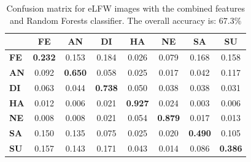\begin{table}[H]
	\fontsize{12}{12}
	\centering
	
	\caption{Confusion matrix for eLFW images with the combined features and Random Forests classifier. The overall accuracy is: $67.3\%$}
	\label{Table:eLFW&Random}
	\begin{tabular}{@{}|l|c|c|c|c|c|c|c|@{}}
		\hline
		& \textbf{FE}     & \textbf{AN}    & \textbf{DI}    & \textbf{HA} & \textbf{NE} & \textbf{SA}    & \textbf{SU}            \\ \hline 
		\textbf{FE} & \textbf{0.232} & 0.153          & 0.184          & 0.026           & 0.079           & 0.168          & 0.158           \\ \hline 
		\textbf{AN} & 0.092          & \textbf{0.650} & 0.058          & 0.025           & 0.017           & 0.042          & 0.117           \\ \hline 
		\textbf{DI} & 0.063          & 0.044          & \textbf{0.738} & 0.050           & 0.038           & 0.038          & 0.031           \\ \hline 
		\textbf{HA} & 0.012          & 0.006          & 0.021          & \textbf{0.927}  & 0.024           & 0.003          & 0.006           \\ \hline 
		\textbf{NE} & 0.008          & 0.008           & 0.021          & 0.054           & \textbf{0.879}  & 0.017           & 0.013          \\ \hline 
		\textbf{SA} & 0.150          & 0.135          & 0.075          & 0.025           & 0.020           & \textbf{0.490}  & 0.105               \\ \hline 
		\textbf{SU} & 0.157          & 0.143          & 0.171          & 0.043           & 0.014           & 0.086           & \textbf{0.386}  \\ \hline 
	\end{tabular}
	
\end{table}







%

